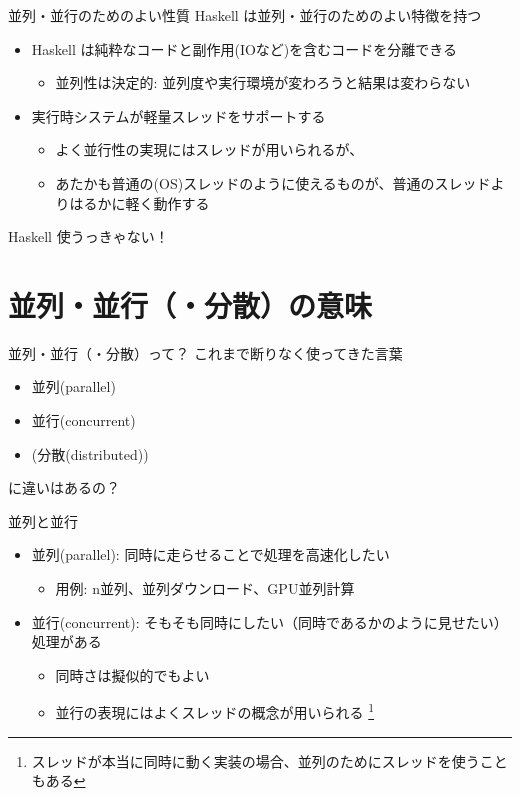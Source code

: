 \documentclass[unicode,12pt]{beamer}
\begin{document}
\begin{frame}{並列・並行のためのよい性質}
  Haskell は並列・並行のためのよい特徴を持つ
  \begin{itemize}
  \item Haskell は純粋なコードと副作用(IOなど)を含むコードを分離できる
    \begin{itemize}
    \item 並列性は\alert{決定的}: 並列度や実行環境が変わろうと結果は変わらない
    \end{itemize}
  \item 実行時システムが\alert{軽量スレッド}をサポートする
    \begin{itemize}
    \item よく並行性の実現にはスレッドが用いられるが、
    \item あたかも普通の(OS)スレッドのように使えるものが、普通のスレッドよりはるかに軽く動作する
    \end{itemize}
  \end{itemize}
  Haskell 使うっきゃない！
\end{frame}

\section{並列・並行（・分散）の意味}

\begin{frame}{並列・並行（・分散）って？}
  これまで断りなく使ってきた言葉
  \begin{itemize}
  \item 並列(parallel)
  \item 並行(concurrent)
  \item (分散(distributed))
  \end{itemize}
  に違いはあるの？
\end{frame}

\begin{frame}{並列と並行}
  \begin{itemize}
  \item 並列(parallel): 同時に走らせることで処理を\alert{高速化}したい
    \begin{itemize}
    \item 用例: n並列、並列ダウンロード、GPU並列計算
    \end{itemize}
  \item 並行(concurrent): \alert{そもそも}同時にしたい（同時であるかのように見せたい）処理がある
    \begin{itemize}
    \item 同時さは擬似的でもよい
    \item 並行の表現にはよくスレッドの概念が用いられる
      \footnote{スレッドが本当に同時に動く実装の場合、並列のためにスレッドを使うこともある}
    \end{itemize}
  \end{itemize}
\end{frame}
\end{document}

